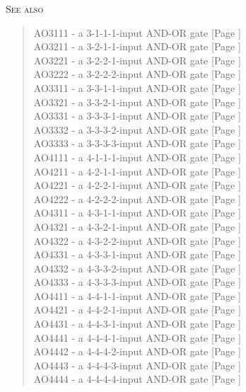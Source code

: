 \textsc{See also}
\begin{quote}
    AO3111 - a 3-1-1-1-input AND-OR gate [Page \pageref{AO3111}] \\
    AO3211 - a 3-2-1-1-input AND-OR gate [Page \pageref{AO3211}] \\
    AO3221 - a 3-2-2-1-input AND-OR gate [Page \pageref{AO3221}] \\
    AO3222 - a 3-2-2-2-input AND-OR gate [Page \pageref{AO3222}] \\
    AO3311 - a 3-3-1-1-input AND-OR gate [Page \pageref{AO3311}] \\
    AO3321 - a 3-3-2-1-input AND-OR gate [Page \pageref{AO3321}] \\
    AO3331 - a 3-3-3-1-input AND-OR gate [Page \pageref{AO3331}] \\
    AO3332 - a 3-3-3-2-input AND-OR gate [Page \pageref{AO3332}] \\
    AO3333 - a 3-3-3-3-input AND-OR gate [Page \pageref{AO3333}] \\
    AO4111 - a 4-1-1-1-input AND-OR gate [Page \pageref{AO4111}] \\
    AO4211 - a 4-2-1-1-input AND-OR gate [Page \pageref{AO4211}] \\
    AO4221 - a 4-2-2-1-input AND-OR gate [Page \pageref{AO4221}] \\
    AO4222 - a 4-2-2-2-input AND-OR gate [Page \pageref{AO4222}] \\
    AO4311 - a 4-3-1-1-input AND-OR gate [Page \pageref{AO4311}] \\
    AO4321 - a 4-3-2-1-input AND-OR gate [Page \pageref{AO4321}] \\
    AO4322 - a 4-3-2-2-input AND-OR gate [Page \pageref{AO4322}] \\
    AO4331 - a 4-3-3-1-input AND-OR gate [Page \pageref{AO4331}] \\
    AO4332 - a 4-3-3-2-input AND-OR gate [Page \pageref{AO4332}] \\
    AO4333 - a 4-3-3-3-input AND-OR gate [Page \pageref{AO4333}] \\
    AO4411 - a 4-4-1-1-input AND-OR gate [Page \pageref{AO4411}] \\
    AO4421 - a 4-4-2-1-input AND-OR gate [Page \pageref{AO4421}] \\
    AO4431 - a 4-4-3-1-input AND-OR gate [Page \pageref{AO4431}] \\
    AO4441 - a 4-4-4-1-input AND-OR gate [Page \pageref{AO4441}] \\
    AO4442 - a 4-4-4-2-input AND-OR gate [Page \pageref{AO4442}] \\
    AO4443 - a 4-4-4-3-input AND-OR gate [Page \pageref{AO4443}] \\
    AO4444 - a 4-4-4-4-input AND-OR gate [Page \pageref{AO4444}] \\
\end{quote}
